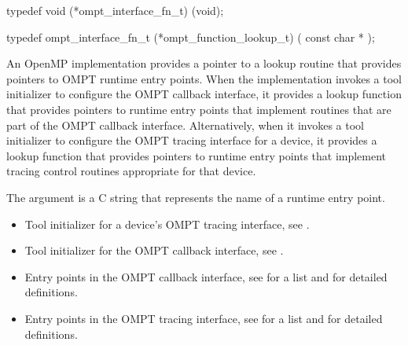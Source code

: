\format
\begin{ccppspecific}
\begin{omptInquiry}
typedef void (*ompt_interface_fn_t) (void);

typedef ompt_interface_fn_t (*ompt_function_lookup_t) (
  const char *
);
\end{omptInquiry}
\end{ccppspecific}

\descr
An OpenMP implementation provides a pointer to a lookup routine that 
provides pointers to OMPT runtime entry points. When the implementation 
invokes a tool initializer to configure the OMPT callback interface, it 
provides a lookup function that provides pointers to runtime entry points 
that implement routines that are part of the OMPT callback interface. 
Alternatively, when it invokes a tool initializer to configure the OMPT 
tracing interface for a device, it provides a lookup function that provides
pointers to runtime entry points that implement tracing control routines 
appropriate for that device.

\argdesc
The  argument is a C string that represents 
the name of a runtime entry point.

\crossreferences
\begin{itemize}
\item Tool initializer for a device's OMPT tracing interface, 
see .

\item Tool initializer for the OMPT callback interface, 
see .

\item Entry points in the OMPT callback interface, see
   for a list and
   for detailed definitions.

\item Entry points in the OMPT tracing interface, see
   for a list and
   for detailed definitions.
\end{itemize}
